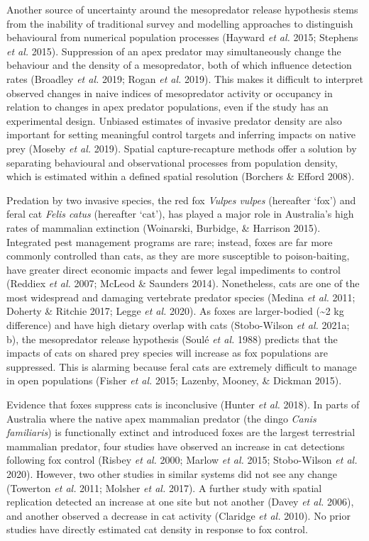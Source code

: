 \documentclass[]{elsarticle} %
\begin{document}
Another source of uncertainty around the mesopredator release hypothesis stems from the inability of traditional survey and modelling approaches to distinguish behavioural from numerical population processes (Hayward \emph{et al.} 2015; Stephens \emph{et al.} 2015). Suppression of an apex predator may simultaneously change the behaviour and the density of a mesopredator, both of which influence detection rates (Broadley \emph{et al.} 2019; Rogan \emph{et al.} 2019). This makes it difficult to interpret observed changes in naive indices of mesopredator activity or occupancy in relation to changes in apex predator populations, even if the study has an experimental design. Unbiased estimates of invasive predator density are also important for setting meaningful control targets and inferring impacts on native prey (Moseby \emph{et al.} 2019). Spatial capture-recapture methods offer a solution by separating behavioural and observational processes from population density, which is estimated within a defined spatial resolution (Borchers \& Efford 2008).

Predation by two invasive species, the red fox \emph{Vulpes vulpes} (hereafter `fox') and feral cat \emph{Felis catus} (hereafter `cat'), has played a major role in Australia's high rates of mammalian extinction (Woinarski, Burbidge, \& Harrison 2015). Integrated pest management programs are rare; instead, foxes are far more commonly controlled than cats, as they are more susceptible to poison-baiting, have greater direct economic impacts and fewer legal impediments to control (Reddiex \emph{et al.} 2007; McLeod \& Saunders 2014). Nonetheless, cats are one of the most widespread and damaging vertebrate predator species (Medina \emph{et al.} 2011; Doherty \& Ritchie 2017; Legge \emph{et al.} 2020). As foxes are larger-bodied (\textasciitilde2 kg difference) and have high dietary overlap with cats (Stobo-Wilson \emph{et al.} 2021a; b), the mesopredator release hypothesis (Soulé \emph{et al.} 1988) predicts that the impacts of cats on shared prey species will increase as fox populations are suppressed. This is alarming because feral cats are extremely difficult to manage in open populations (Fisher \emph{et al.} 2015; Lazenby, Mooney, \& Dickman 2015).

Evidence that foxes suppress cats is inconclusive (Hunter \emph{et al.} 2018). In parts of Australia where the native apex mammalian predator (the dingo \emph{Canis familiaris}) is functionally extinct and introduced foxes are the largest terrestrial mammalian predator, four studies have observed an increase in cat detections following fox control (Risbey \emph{et al.} 2000; Marlow \emph{et al.} 2015; Stobo-Wilson \emph{et al.} 2020). However, two other studies in similar systems did not see any change (Towerton \emph{et al.} 2011; Molsher \emph{et al.} 2017). A further study with spatial replication detected an increase at one site but not another (Davey \emph{et al.} 2006), and another observed a decrease in cat activity (Claridge \emph{et al.} 2010). No prior studies have directly estimated cat density in response to fox control.
\end{document}
